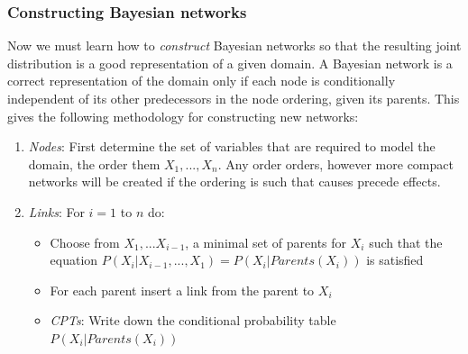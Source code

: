 \documentclass{article}
\begin{document}
\subsubsection{Constructing Bayesian networks}
Now we must learn how to \textit{construct} Bayesian networks so that the resulting joint distribution is a good representation of a given domain. A Bayesian network is a correct representation of the domain only if each node is conditionally independent of its other predecessors in the node ordering, given its parents. This gives the following methodology for constructing new networks:
\begin{enumerate}
\item \textit{Nodes}: First determine the set of variables that are required to model the domain, the order them ${X_{1}, ..., X_{n}}$. Any order orders, however more compact networks will be created if the ordering is such that causes precede effects.
\item \textit{Links}: For $i = 1$ to $n$ do:
	\begin{itemize}
	\item Choose from $X_{1}, ... X_{i-1}$, a minimal set of parents for $X_{i}$ such that the equation $P(X_{i}|X_{i-1},...,X_{1}) = P(X_{i}|Parents(X_{i}))$ is satisfied
	\item For each parent insert a link from the parent to $X_{i}$
	\item \textit{CPTs}: Write down the conditional probability table $P(X_{i}|Parents(X_{i}))$
	\end{itemize}
\end{enumerate}
\end{document}
